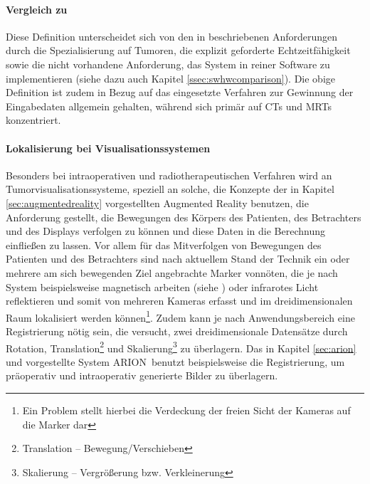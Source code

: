 \documentclass[ngerman,pdftex,paper=A4,DIV=calc,titlepage,12pt]{scrartcl}
\newtheorem[L]{boxedDefinition}{Definition}
\begin{document}
\paragraph{Vergleich zu \cite[Kapitel 3.1.1, Seite 17f.]{Bruckner2004}}\label{p:bru04comparison}
Diese Definition unterscheidet sich von den in \cite[Kapitel 3.1.1, Seite 17]{Bruckner2004} beschriebenen Anforderungen durch die Spezialisierung auf Tumoren, die explizit geforderte Echtzeitfähigkeit sowie die nicht vorhandene Anforderung, das System in reiner Software zu implementieren (siehe dazu auch Kapitel \vref{ssec:swhwcomparison}). Die obige Definition ist zudem in Bezug auf das eingesetzte Verfahren zur Gewinnung der Eingabedaten allgemein gehalten, während \cite{Bruckner2004} sich primär auf CTs und MRTs konzentriert.

\paragraph{Lokalisierung bei Visualisationssystemen}
Besonders bei intraoperativen und radiotherapeutischen Verfahren wird an Tumorvisualisationssysteme, speziell an solche, die Konzepte der in Kapitel \ref{sec:augmentedreality} vorgestellten Augmented Reality benutzen, die Anforderung gestellt, die Bewegungen des Körpers des Patienten, des Betrachters und des Displays verfolgen zu können und diese Daten in die Berechnung einfließen zu lassen. Vor allem für das Mitverfolgen von Bewegungen des Patienten und des Betrachters sind nach aktuellem Stand der Technik ein oder mehrere am sich bewegenden Ziel angebrachte Marker vonnöten, die je nach System beispielsweise magnetisch arbeiten (siehe \cite{Suthau2002DE}) oder infrarotes Licht reflektieren und somit von mehreren Kameras erfasst und im dreidimensionalen Raum lokalisiert werden können\footnote{Ein Problem stellt hierbei die Verdeckung der freien Sicht der Kameras auf die Marker dar}. Zudem kann je nach Anwendungsbereich eine Registrierung nötig sein, die versucht, zwei dreidimensionale Datensätze durch Rotation, Translation\footnote{Translation -- Bewegung/Verschieben} und Skalierung\footnote{Skalierung -- Vergrößerung bzw. Verkleinerung} zu überlagern. Das in Kapitel \vref{sec:arion} und \cite{Suthau2002DE} vorgestellte System ARION\texttrademark\ benutzt beispielsweise die Registrierung, um präoperativ und intraoperativ generierte Bilder zu überlagern.
\end{document}
